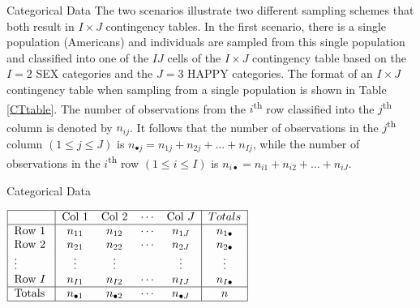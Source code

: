 \documentclass[
  ignorenonframetext,
]{beamer}
\begin{document}
\begin{frame}{Categorical Data}
\label{categorical-data-1}
The two scenarios illustrate two different sampling schemes that both
result in \(I \times J\) contingency tables. In the first scenario,
there is a single population (Americans) and individuals are sampled
from this single population and classified into one of the \(IJ\) cells
of the \(I\times J\) contingency table based on the \(I=2\) SEX
categories and the \(J=3\) HAPPY categories. The format of an
\(I \times J\) contingency table when sampling from a single population
is shown in Table \ref{CTtable}. The number of observations from the
\(i\)\textsuperscript{th} row classified into the
\(j\)\textsuperscript{th} column is denoted by \(n_{ij}\). It follows
that the number of observations in the \(j\)\textsuperscript{th} column
\((1 \le j \le J)\) is \(n_{\bullet j}=n_{1j}+n_{2j}+\dots+n_{Ij}\),
while the number of observations in the \(i\)\textsuperscript{th} row
\((1 \le i \le I)\) is \(n_{i\bullet}=n_{i1}+n_{i2}+\dots+n_{iJ}\).
\end{frame}

\begin{frame}{Categorical Data}
\label{categorical-data-2}
\begin{table}[!ht]
\caption{Contingency table when sampling from a single population\label{CTtable}}
\medskip
\centerline{$\setlength{\arraycolsep}{2mm}
\begin{array}{|l|*{4}{c}|c|}
\hline
&    \text{Col } 1 &  \text{Col }2&   \cdots &  \text{Col }J&   Totals\\
\hline
\text{Row }1  & n_{11} & n_{12}  &\cdots&        n_{1J} & n_{1\bullet}\\
\text{Row }2  & n_{21} & n_{22}  &\cdots&        n_{2J} & n_{2\bullet}\\
\vdots &       \vdots &  \vdots &     &          \vdots &\vdots\\
\text{Row }I  & n_{I1} & n_{I2} &\cdots&         n_{IJ} & n_{I\bullet}\\ \hline
\text{Totals }& n_{\bullet 1}  & n_{\bullet 2}  &\cdots&         n_{\bullet J}  & n\\
\hline
\end{array}$\setlength{\arraycolsep}{1.5pt}}
\end{table}
\end{frame}
\end{document}
